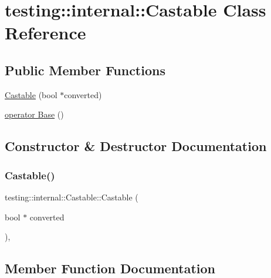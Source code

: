 \hypertarget{classtesting_1_1internal_1_1_castable}{}\section{testing\+:\+:internal\+:\+:Castable Class Reference}
\label{classtesting_1_1internal_1_1_castable}
\subsection*{Public Member Functions}
\begin{DoxyCompactItemize}
\item 
\hyperlink{classtesting_1_1internal_1_1_castable_a705d519a227d38ff5c174905316f62c4}{Castable} (bool $\ast$converted)
\item 
\hyperlink{classtesting_1_1internal_1_1_castable_ac60b2e7885f3b09defb829eddaa0afd9}{operator Base} ()
\end{DoxyCompactItemize}


\subsection{Constructor \& Destructor Documentation}
\mbox{\label{classtesting_1_1internal_1_1_castable_a705d519a227d38ff5c174905316f62c4}} 
\subsubsection{\texorpdfstring{Castable()}{Castable()}}
{\footnotesize\ttfamily testing\+::internal\+::\+Castable\+::\+Castable (\begin{DoxyParamCaption}\item[{bool $\ast$}]{converted }\end{DoxyParamCaption})\hspace{0.3cm}{\ttfamily [inline]}, {\ttfamily [explicit]}}



\subsection{Member Function Documentation}
\mbox{\label{classtesting_1_1internal_1_1_castable_ac60b2e7885f3b09defb829eddaa0afd9}} 
